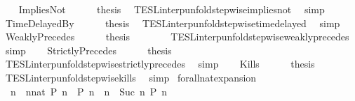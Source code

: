\begin{isabellebody}
\isanewline
\ \ \isamarkupfalse%
\ ImpliesNot\isanewline
\ \ \ \ \isamarkupfalse%
\ {\isacharquery}thesis\ \isamarkupfalse%
\ TESL{\isacharunderscore}interp{\isacharunderscore}unfold{\isacharunderscore}stepwise{\isacharunderscore}implies{\isacharunderscore}not\ \isamarkupfalse%
\ simp\isanewline
{}\isamarkupfalse%
\isanewline
\ \ \isamarkupfalse%
\ TimeDelayedBy\isanewline
\ \ \ \ \isamarkupfalse%
\ {\isacharquery}thesis\ \isamarkupfalse%
\ TESL{\isacharunderscore}interp{\isacharunderscore}unfold{\isacharunderscore}stepwise{\isacharunderscore}timedelayed\ \isamarkupfalse%
\ simp\isanewline
{}\isamarkupfalse%
\isanewline
\ \ \isamarkupfalse%
\ WeaklyPrecedes\isanewline
\ \ \ \ \isamarkupfalse%
\ {\isacharquery}thesis\isanewline
\ \ \ \ \ \ \isamarkupfalse%
\ TESL{\isacharunderscore}interp{\isacharunderscore}unfold{\isacharunderscore}stepwise{\isacharunderscore}weakly{\isacharunderscore}precedes\ \isamarkupfalse%
\ simp\isanewline
{}\isamarkupfalse%
\isanewline
\ \ \isamarkupfalse%
\ StrictlyPrecedes\isanewline
\ \ \ \ \isamarkupfalse%
\ {\isacharquery}thesis\isanewline
\ \ \ \ \ \ \isamarkupfalse%
\ TESL{\isacharunderscore}interp{\isacharunderscore}unfold{\isacharunderscore}stepwise{\isacharunderscore}strictly{\isacharunderscore}precedes\ \isamarkupfalse%
\ simp\isanewline
{}\isamarkupfalse%
\isanewline
\ \ \isamarkupfalse%
\ Kills\isanewline
\ \ \ \ \isamarkupfalse%
\ {\isacharquery}thesis\isanewline
\ \ \ \ \ \ \isamarkupfalse%
\ TESL{\isacharunderscore}interp{\isacharunderscore}unfold{\isacharunderscore}stepwise{\isacharunderscore}kills\ \isamarkupfalse%
\ simp\isanewline
{}\isamarkupfalse%
%
\endisatagproof
{\isafoldproof}%
%
\isadelimproof
\isanewline
%
\endisadelimproof
\isanewline
{}\isamarkupfalse%
\ forall{\isacharunderscore}nat{\isacharunderscore}expansion{\isacharcolon}\isanewline
\ \ {\isacartoucheopen}{\isacharparenleft}{\isasymforall}n\ {\isasymge}\ {\isacharparenleft}nnat{\isacharparenright}{\isachardot}\ P\ n{\isacharparenright}\ {\isacharequal}\ {\isacharparenleft}P\ n\ {\isasymand}\ {\isacharparenleft}{\isasymforall}n\ {\isasymge}\ Suc\ n\ P\ n{\isacharparenright}{\isacharparenright}{\isacartoucheclose}\isanewline

\end{isabellebody}
